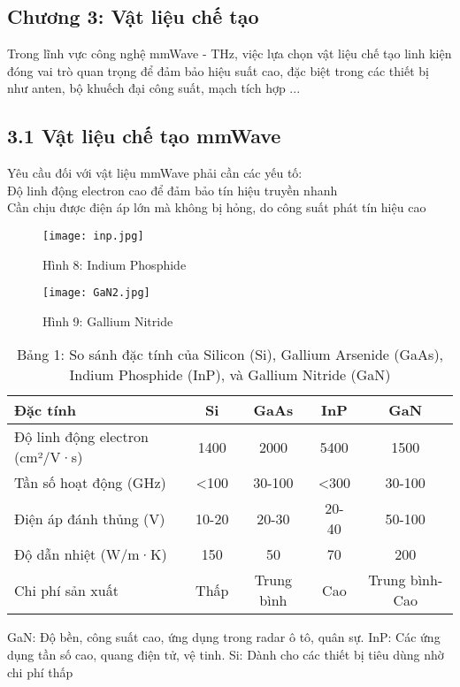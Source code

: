 \documentclass[a4paper,13pt]{article}
\begin{document}
\begin{center}
    \section{Chương 3: Vật liệu chế tạo}
\end{center}
Trong lĩnh vực công nghệ mmWave - THz, việc lựa chọn vật liệu chế tạo linh kiện đóng vai trò quan trọng để đảm bảo hiệu suất cao, đặc biệt trong các thiết bị như anten, bộ khuếch đại công suất, mạch tích hợp ...
\subsection{3.1 Vật liệu chế tạo mmWave}
Yêu cầu đối với vật liệu mmWave phải cần các yếu tố: \\
Độ linh động electron cao để đảm bảo tín hiệu truyền nhanh\\ Cần chịu được điện áp lớn mà không bị hỏng, do công suất phát tín hiệu cao
\begin{figure}[htbp]
    \centering
    \texttt{[image: inp.jpg]}
    \caption*{Hình 8: Indium Phosphide \cite{key5} }
    \texttt{[image: GaN2.jpg]}
    \caption*{Hình 9: Gallium Nitride   }
    \label{fig:model}
\end{figure}

\begin{table}[h]
    \centering
    \caption{Bảng 1: So sánh đặc tính của Silicon (Si), Gallium Arsenide (GaAs), Indium Phosphide (InP), và Gallium Nitride (GaN)}
    \begin{tabular}{lcccc}
        \toprule
        \textbf{Đặc tính} & \textbf{Si} & \textbf{GaAs} & \textbf{InP} & \textbf{GaN} \\
        \midrule
        Độ linh động electron (cm²/V·s) & 1400 & 2000 & 5400 & 1500 \\
        Tần số hoạt động (GHz) & <100 & 30-100 & <300 & 30-100 \\
        Điện áp đánh thủng (V) & 10-20 & 20-30 & 20-40 & 50-100 \\
        Độ dẫn nhiệt (W/m·K) & 150 & 50 & 70 & 200 \\
        Chi phí sản xuất & Thấp & Trung bình & Cao & Trung bình-Cao \\
        \bottomrule
    \end{tabular}
    \label{tab:material_comparison}
\end{table} GaN: Độ bền, công suất cao, ứng dụng trong radar ô tô, quân sự. InP: Các ứng dụng tần số cao, quang điện tử, vệ tinh. Si: Dành cho các thiết bị tiêu dùng nhờ chi phí thấp
\end{document}
